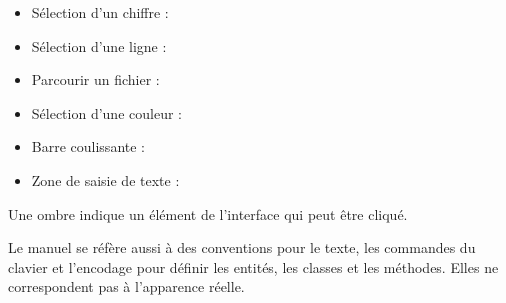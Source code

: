 \begin{itemize}
%
\item Sélection d'un chiffre : 
%
\item Sélection d'une ligne : 
%
%
\item Parcourir un fichier : \browsebutton 
%
\item Sélection d'une couleur : 
%
\item Barre coulissante : 
%
\item Zone de saisie de texte : 
\end{itemize}
Une ombre indique un élément de l'interface qui peut être cliqué.

% 


Le manuel se réfère aussi à des conventions pour le texte, les commandes du clavier et l'encodage pour définir les entités, les classes et les méthodes. Elles ne correspondent pas à l'apparence réelle.

